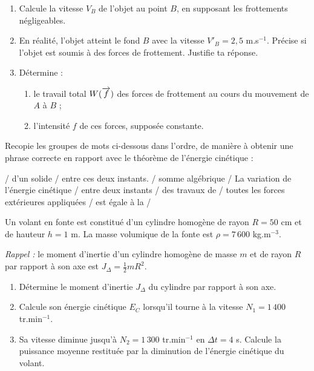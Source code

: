 \begin{enumerate}
  \item Calcule la vitesse $V_B$ de l'objet au point $B$, en supposant les frottements négligeables.
  \item En réalité, l'objet atteint le fond $B$ avec la vitesse $V'_B = 2,5$ m.s$^{-1}$.
        Précise si l'objet est soumis à des forces de frottement. Justifie ta réponse.
  \item Détermine :
  \begin{enumerate}[label=3.\arabic*.]
    \item le travail total $W(\overrightarrow{f})$ des forces de frottement au cours du mouvement de $A$ à $B$ ;
    \item l'intensité $f$ de ces forces, supposée constante.
  \end{enumerate}
\end{enumerate}

Recopie les groupes de mots ci-dessous dans l'ordre, de manière à obtenir une phrase correcte en
rapport avec le théorème de l'énergie cinétique :

\begin{center}
/ d'un solide / entre ces deux instants. / somme algébrique / La variation de l'énergie cinétique /
entre deux instants / des travaux de / toutes les forces extérieures appliquées / est égale à la /
\end{center}

Un volant en fonte est constitué d'un cylindre homogène de rayon $R = 50$ cm et de hauteur
$h = 1$ m. La masse volumique de la fonte est $\rho = 7\,600$ kg.m$^{-3}$.

\emph{Rappel :} le moment d'inertie d'un cylindre homogène de masse $m$ et de rayon $R$ par rapport
à son axe est $J_\Delta = \frac{1}{2} m R^2$.
\begin{enumerate}
  \item Détermine le moment d'inertie $J_\Delta$ du cylindre par rapport à son axe.
  \item Calcule son énergie cinétique $E_C$ lorsqu'il tourne à la vitesse
        $N_1 = 1\,400$ tr.min$^{-1}$.
  \item Sa vitesse diminue jusqu'à $N_2 = 1\,300$ tr.min$^{-1}$ en $\Delta t = 4$ s.
        Calcule la puissance moyenne restituée par la diminution de l'énergie cinétique du volant.
\end{enumerate}

